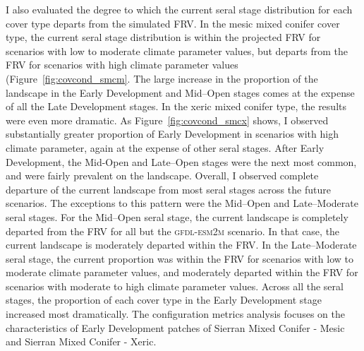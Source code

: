 I also evaluated the degree to which the current seral stage distribution for each cover type departs from the simulated FRV. 
%
In the mesic mixed conifer cover type, the current seral stage distribution is within the projected FRV for scenarios with low to moderate climate parameter values, but departs from the FRV for scenarios with high climate parameter values (Figure~\ref{fig:covcond_smcm}. The large increase in the proportion of the landscape in the Early Development and Mid--Open stages comes at the expense of all the Late Development stages.
%
In the xeric mixed conifer type, the results were even more dramatic. As Figure~\ref{fig:covcond_smcx} shows, I observed substantially greater proportion of Early Development in scenarios with high climate parameter, again at the expense of other seral stages. After Early Development, the Mid-Open and Late--Open stages were the next most common, and were fairly prevalent on the landscape. Overall, I observed complete departure of the current landscape from most seral stages across the future scenarios. The exceptions to this pattern were the Mid--Open and Late--Moderate seral stages. For the Mid--Open seral stage, the current landscape is completely departed from the FRV for all but the \textsc{gfdl-esm2m} scenario. In that case, the current landscape is moderately departed within the FRV. In the Late--Moderate seral stage, the current proportion was within the FRV for scenarios with low to moderate climate parameter values, and moderately departed within the FRV for scenarios with moderate to high climate parameter values. 
%
Across all the seral stages, the proportion of each cover type in the Early Development stage increased most dramatically. The configuration metrics analysis focuses on the characteristics of Early Development patches of Sierran Mixed Conifer - Mesic and Sierran Mixed Conifer - Xeric.

